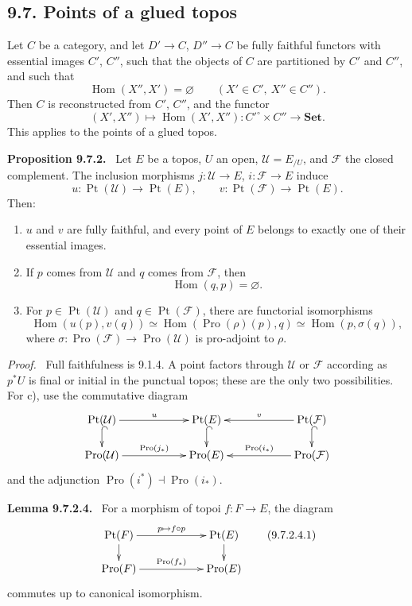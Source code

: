\documentclass[11pt]{article}
\newcommand{\Uu}{\mathcal{U}}
\newcommand{\Ff}{\mathcal{F}}
\newcommand{\Set}{\mathbf{Set}}
\newcommand{\Hom}{\operatorname{Hom}}
\newcommand{\Pro}{\operatorname{Pro}}
\newcommand{\Ppoint}{\operatorname{Pt}}
\newenvironment{statement}[1]{\par\medskip\noindent\textbf{#1.}\ }{\par\medskip}
\newenvironment{prooftext}{\par\noindent\emph{Proof.}\ }{\par\medskip}
\begin{document}
\subsection*{9.7. Points of a glued topos}

Let \(C\) be a category, and let \(D'\to C\), \(D''\to C\) be fully faithful functors with essential images \(C'\), \(C''\), such that the objects of \(C\) are partitioned by \(C'\) and \(C''\), and such that
\[
\Hom(X'',X')=\varnothing\qquad(X'\in C',\ X''\in C'').
\]
Then \(C\) is reconstructed from \(C'\), \(C''\), and the functor
\[
(X',X'')\longmapsto\Hom(X',X''):{C'}^\circ\times C''\to\Set.
\]
This applies to the points of a glued topos.

\begin{statement}{Proposition 9.7.2}
Let \(E\) be a topos, \(U\) an open, \(\Uu=E_{/U}\), and \(\Ff\) the closed complement. The inclusion morphisms \(j:\Uu\to E\), \(i:\Ff\to E\) induce
\[
u:\Ppoint(\Uu)\longrightarrow\Ppoint(E),\qquad
v:\Ppoint(\Ff)\longrightarrow\Ppoint(E).
\tag{9.7.2.1}
\]
Then:
\begin{enumerate}[label=\alph*)]
\item \(u\) and \(v\) are fully faithful, and every point of \(E\) belongs to exactly one of their essential images.
\item If \(p\) comes from \(\Uu\) and \(q\) comes from \(\Ff\), then
\[
\Hom(q,p)=\varnothing.
\tag{9.7.2.2}
\]
\item For \(p\in\Ppoint(\Uu)\) and \(q\in\Ppoint(\Ff)\), there are functorial isomorphisms
\[
\Hom(u(p),v(q))\simeq\Hom(\Pro(\rho)(p),q)\simeq\Hom(p,\sigma(q)),
\tag{9.7.2.3}
\]
where \(\sigma:\Pro(\Ff)\to\Pro(\Uu)\) is pro-adjoint to \(\rho\).
\end{enumerate}
\end{statement}

\begin{prooftext}
Full faithfulness is 9.1.4. A point factors through \(\Uu\) or \(\Ff\) according as \(p^*U\) is final or initial in the punctual topos; these are the only two possibilities. For c), use the commutative diagram
\[
\xymatrix@C=2cm@R=.55cm{
\Ppoint(\Uu)\ar@{^{(}->}[d]\ar[r]^u&\Ppoint(E)\ar@{^{(}->}[d]&\Ppoint(\Ff)\ar@{^{(}->}[d]\ar[l]_v\\
\Pro(\Uu)\ar[r]^{\Pro(j_*)}&\Pro(E)&\Pro(\Ff)\ar[l]_{\Pro(i_*)}
}
\]
and the adjunction \(\Pro(i^*)\dashv\Pro(i_*)\).
\end{prooftext}

\begin{statement}{Lemma 9.7.2.4}
For a morphism of topoi \(f:F\to E\), the diagram
\[
\xymatrix@C=2cm@R=.5cm{
\Ppoint(F)\ar[r]^{p\mapsto f\circ p}\ar[d]&\Ppoint(E)\ar[d]\\
\Pro(F)\ar[r]^{\Pro(f_*)}&\Pro(E)
}
\tag{9.7.2.4.1}
\]
commutes up to canonical isomorphism.
\end{statement}
\end{document}
